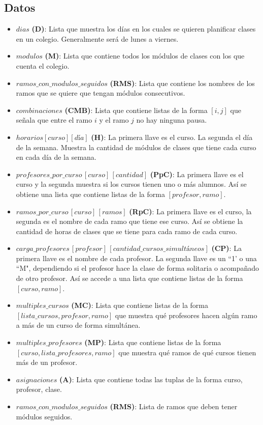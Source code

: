 \documentclass[letterpaper]{article}
\begin{document}
\subsection{Datos}
\begin{itemize}
    \item $dias$ \textbf{(D)}: Lista que muestra los días en los cuales se quieren planificar clases en un colegio. Generalmente será de lunes a viernes.
    \item $modulos$ \textbf{(M)}: Lista que contiene todos los módulos de clases con los que cuenta el colegio.
    \item $ramos\_con\_modulos\_seguidos$ \textbf{(RMS)}: Lista que contiene los nombres de los ramos que se quiere que tengan módulos consecutivos.
    \item $combinaciones$ \textbf{(CMB)}: Lista que contiene listas de la forma $[i,j]$ que señala que entre el ramo $i$ y el ramo $j$ no hay ninguna pausa.
    \item $horarios[curso][día]$ \textbf{(H)}: La primera llave es el curso. La segunda el día de la semana. Muestra la cantidad de módulos de clases que tiene cada curso en cada día de la semana.
    \item $profesores\_por\_curso\,[curso]\,[cantidad]$ \textbf{(PpC)}: La primera llave es el curso y la segunda muestra si los cursos tienen uno o más alumnos. Así se obtiene una lista que contiene listas de la forma $[profesor,ramo]$.
    \item $ramos\_por\_curso \, [curso] \, [ramos]$ \textbf{(RpC)}: La primera llave es el curso, la segunda es el nombre de cada ramo que tiene ese curso. Así se obtiene la cantidad de horas de clases que se tiene para cada ramo de cada curso. 
    \item $carga\_profesores\,[profesor]\,[cantidad\_cursos\_simultáneos]$ \textbf{(CP)}: La primera llave es el nombre de cada profesor. La segunda llave es un ``1' o una ``M", dependiendo si el profesor hace la clase de forma solitaria o acompañado de otro profesor. Así se accede a una lista que contiene listas de la forma $[curso, ramo]$.
    \item $multiples\_cursos$ \textbf{(MC)}: Lista que contiene listas de la forma $[lista\_cursos, profesor, ramo]$ que muestra qué profesores hacen algún ramo a más de un curso de forma simultánea.
    \item $multiples\_profesores$ \textbf{(MP)}: Lista que contiene listas de la forma $[curso, lista\_profesores,ramo]$ que muestra qué ramos de qué cursos tienen más de un profesor.
    \item $asignaciones$ \textbf{(A)}: Lista que contiene todas las tuplas de la forma curso, profesor, clase.
    \item $ramos\_con\_modulos\_seguidos$ \textbf{(RMS)}: Lista de ramos que deben tener módulos seguidos.
\end{itemize}
\end{document}
